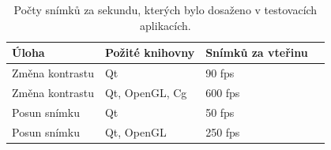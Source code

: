 \noindent
\begin{table}[ht]
  \label{vysledky}
	\centering
\begin{tabular}{| p{5cm} | l | l | l | }

  \hline                       
  Úloha & Požité knihovny & Snímků za vteřinu \\
  \hline
  \hline
  Změna kontrastu & Qt &  90 fps\\
  \hline
  Změna kontrastu & Qt, OpenGL, Cg & 600 fps\\
  \hline
  Posun snímku & Qt & 50  fps \\
  \hline
  Posun snímku  & Qt, OpenGL & 250 fps \\
  \hline  
\end{tabular}
	\caption{Počty snímků za sekundu, kterých bylo dosaženo v testovacích aplikacích.}
\end{table}
























